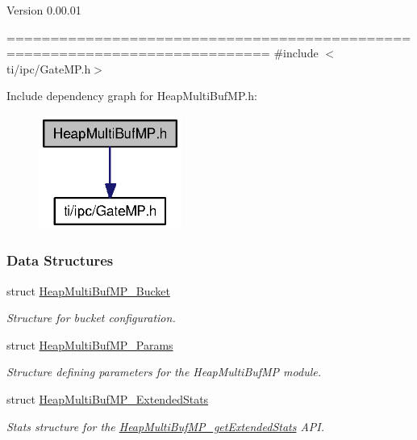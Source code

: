 \begin{DoxyVersion}{Version}
0.00.01
\end{DoxyVersion}
============================================================================ {\ttfamily \#include $<$ti/ipc/GateMP.h$>$}\par
Include dependency graph for HeapMultiBufMP.h:
\nopagebreak
\begin{figure}[H]
\begin{center}
\leavevmode
\includegraphics[width=133pt]{_heap_multi_buf_m_p_8h__incl}
\end{center}
\end{figure}
\subsubsection*{Data Structures}
\begin{DoxyCompactItemize}
\item 
struct \hyperlink{struct_heap_multi_buf_m_p___bucket}{HeapMultiBufMP\_\-Bucket}
\begin{DoxyCompactList}\small\item\em Structure for bucket configuration. \item\end{DoxyCompactList}\item 
struct \hyperlink{struct_heap_multi_buf_m_p___params}{HeapMultiBufMP\_\-Params}
\begin{DoxyCompactList}\small\item\em Structure defining parameters for the HeapMultiBufMP module. \item\end{DoxyCompactList}\item 
struct \hyperlink{struct_heap_multi_buf_m_p___extended_stats}{HeapMultiBufMP\_\-ExtendedStats}
\begin{DoxyCompactList}\small\item\em Stats structure for the \hyperlink{_heap_multi_buf_m_p_8h_a386420101752537b59e12520aafd9b0d}{HeapMultiBufMP\_\-getExtendedStats} API. \item\end{DoxyCompactList}\end{DoxyCompactItemize}
